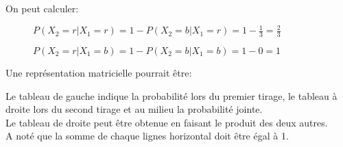 On peut calculer:
\begin{description}
\item[]$P(X_2=r | X_1=r) = 1 - P(X_2=b | X_1=r) = 1 - \frac{1}{3} = \frac{2}{3}$
\item[]$P(X_2=r | X_1=b) = 1 - P(X_2=b | X_1=b) = 1 - 0 = 1$
\end{description}

Une représentation matricielle pourrait être:\\
\begin{multicols}{3}
[]



\end{multicols}

Le tableau de gauche indique la probabilité lors du premier tirage, le tableau à droite lors du second tirage et au milieu la probabilité jointe.\\
Le tableau de droite peut être obtenue en faisant le produit des deux autres.\\
A noté que la somme de chaque lignes horizontal doit être égal à 1.\\


\pagebreak